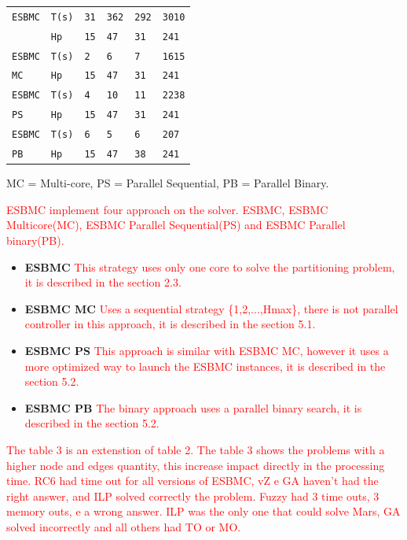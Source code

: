 \begin{table}[h]
\begin{tabular}[c]{m{1.3cm}m{1.20cm}|m{0.85cm}|m{0.85cm}|m{0.85cm}|m{0.85cm}}
\rowcolor{Gray}
\verb|ESBMC| & \verb|T(s)| & \verb|31| & \verb|362| & \verb|292| & \verb|3010|\\
\rowcolor{Gray}
\verb|| & \verb|Hp| & \verb|15| & \verb|47| & \verb|31| & \verb|241|\\
\hline

\verb|ESBMC| & \verb|T(s)| & \verb|2| & \verb|6| & \verb|7| & \verb|1615|\\
\verb|MC| & \verb|Hp| & \verb|15| & \verb|47| & \verb|31| & \verb|241|\\
\hline

\rowcolor{Gray}
\verb|ESBMC| & \verb|T(s)| & \verb|4| & \verb|10| & \verb|11| & \verb|2238|\\
\rowcolor{Gray}
\verb|PS| & \verb|Hp| & \verb|15| & \verb|47| & \verb|31| & \verb|241|\\
\hline

\verb|ESBMC| & \verb|T(s)| & \verb|6| & \verb|5| & \verb|6| & \verb|207|\\
\verb|PB| & \verb|Hp| & \verb|15| & \verb|47| & \verb|38| & \verb|241|\\
\bottomrule[1.5pt]

\end{tabular}
MC = Multi-core, PS = Parallel Sequential, PB = Parallel Binary.
\end{table}

\textcolor{Red}{ESBMC implement four approach on the solver. ESBMC, ESBMC Multicore(MC), ESBMC Parallel Sequential(PS) and ESBMC Parallel binary(PB).}
\begin{itemize}
\item{\textbf{ESBMC}\textcolor{Red}{
This strategy uses only one core to solve the partitioning problem, it is described in the section 2.3.}}
\item{\textbf{ESBMC MC}\textcolor{Red}{
Uses a sequential strategy \{1\:,2\:,\:...\:,\:Hmax\}, there is not parallel controller in this approach, it is described in the section 5.1.}}
\item{\textbf{ESBMC PS}\textcolor{Red}{
This approach is similar with ESBMC MC, however it uses a more optimized way to launch the ESBMC instances, it is described in the section 5.2.}}
\item{\textbf{ESBMC PB}\textcolor{Red}{
The binary approach uses a parallel binary search, it is described in the section 5.2.}}
\end{itemize}

\textcolor{Red}{The table 3 is an extenstion of table 2. The table 3 shows the problems with a higher node and edges quantity, this increase impact directly in the processing time. RC6 had time out for all versions of ESBMC, vZ e GA haven't had the right answer, and ILP solved correctly the problem. Fuzzy had 3 time outs, 3 memory outs, e a wrong answer. ILP was the only one that could solve Mars, GA solved incorrectly and all others had TO or MO.} 

